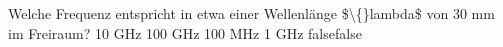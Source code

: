     {Welche Frequenz entspricht in etwa einer Wellenlänge \$\textbackslash\{\}lambda\$ von 30 mm im Freiraum?}
    {10 GHz}
    {100 GHz}
    {100 MHz}
    {1 GHz}
    {false}{false}